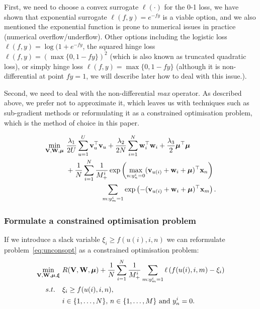 First, we need to choose a convex surrogate $\ell(\cdot)$ for the 0-1 loss,
we have shown that exponential surrogate $\ell(f, y) = e^{-fy}$ is a viable option,
and we also mentioned the exponential function is prone to numerical issues in practice (\eg numerical overflow/underflow).
Other options including the logistic loss $\ell(f, y) = \log(1 + e^{-fy}$,
the squared hinge loss $\ell(f, y) = \left( \max \{0, 1 - fy\} \right)^2$ (which is also known as truncated quadratic loss),
or simply hinge loss $\ell(f, y) = \max \{0, 1 - fy\}$ 
(although it is non-differential at point $fy = 1$, we will describe later how to deal with this issue.).

Second, we need to deal with the non-differential \emph{max} operator.
As described above, we prefer not to approximate it, 
which leaves us with techniques such as sub-gradient methods or 
reformulating it as a constrained optimisation problem, which is the method of choice in this paper.

\begin{equation}
\label{eq:cvxopt}
\begin{aligned}
\min_{\mathbf{V}, \mathbf{W}, \bm{\mu}} \
& \frac{\lambda_1}{2U} \sum_{u=1}^U \mathbf{v}_u^\top \mathbf{v}_u + \frac{\lambda_2}{2N} \sum_{i=1}^N \mathbf{w}_i^\top \mathbf{w}_i + \frac{\lambda_3}{2} \bm{\mu}^\top \bm{\mu} \\
& + \frac{1}{N} \sum_{i=1}^N \frac{1}{M_+^i} 
    \exp \left( \max_{n: y_n^i = 0} (\mathbf{v}_{u(i)} + \mathbf{w}_i + \bm{\mu})^\top \mathbf{x}_n \right) \\
& \hspace{5em} \sum_{m: y_m^i = 1} \exp \left( - (\mathbf{v}_{u(i)} + \mathbf{w}_i + \bm{\mu})^\top \mathbf{x}_m \right).
\end{aligned}
\end{equation}



\subsubsection{Formulate a constrained optimisation problem}
If we introduce a slack variable $\xi_i \ge f(u(i), i, n)$
we can reformulate problem~\ref{eq:unconsopt} as a constrained optimisation problem:
\begin{equation}
\label{eq:cvxopt}
\begin{aligned}
\min_{\mathbf{V}, \mathbf{W}, \bm{\mu}, \bm{\xi}} \ & R(\mathbf{V}, \mathbf{W}, \bm{\mu})
  + \frac{1}{N} \sum_{i=1}^N \frac{1}{M_+^i} \sum_{m: y_m^i = 1} \ell \left( f(u(i), i, m) - \xi_i \right) \\
s.t. \quad & 
\xi_i \ge f(u(i), i, n), \\
& i \in \{1,\dots,N\}, \, n \in \{1,\dots,M\} \ \mathrm{and} \ y_n^i = 0.
\end{aligned}
\end{equation}

